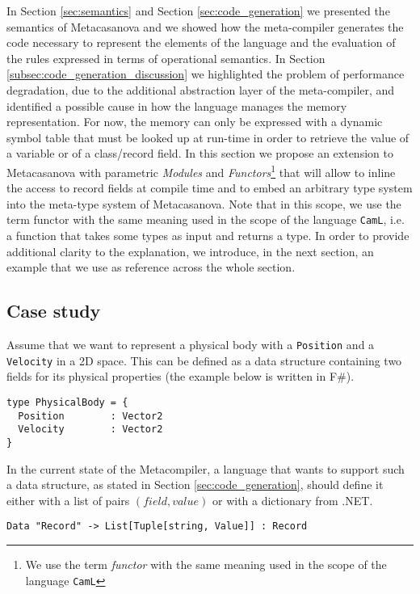 In Section \ref{sec:semantics} and Section \ref{sec:code_generation} we presented the semantics of Metacasanova and we showed how the meta-compiler generates the code necessary to represent the elements of the language and the evaluation of the rules expressed in terms of operational semantics. In Section \ref{subsec:code_generation_discussion} we highlighted the problem of performance degradation, due to the additional abstraction layer of the meta-compiler, and identified a possible cause in how the language manages the memory representation. For now, the memory can only be expressed with a dynamic symbol table that must be looked up at run-time in order to retrieve the value of a variable or of a class/record field. In this section we propose an extension to Metacasanova with parametric \textit{Modules} and \textit{Functors}\footnote{We use the term \textit{functor} with the same meaning used in the scope of the language \texttt{CamL}} that will allow to inline the access to record fields at compile time and to embed an arbitrary type system into the meta-type system of Metacasanova. Note that in this scope, we use the term functor with the same meaning used in the scope of the language \texttt{CamL}, i.e. a function that takes some types as input and returns a type. In order to provide additional clarity to the explanation, we introduce, in the next section, an example that we use as reference across the whole section.

\subsection{Case study}
Assume that we want to represent a physical body with a \texttt{Position} and a \texttt{Velocity} in a 2D space. This can be defined as a data structure containing two fields for its physical properties (the example below is written in F\#). 

\begin{lstlisting}
type PhysicalBody = {
  Position        : Vector2
  Velocity        : Vector2
}
\end{lstlisting}

In the current state of the Metacompiler, a language that wants to support such a data structure, as stated in Section \ref{sec:code_generation}, should define it either with a list of pairs $(field,value)$ or with a dictionary from .NET.

\begin{lstlisting}
Data "Record" -> List[Tuple[string, Value]] : Record
\end{lstlisting} 

